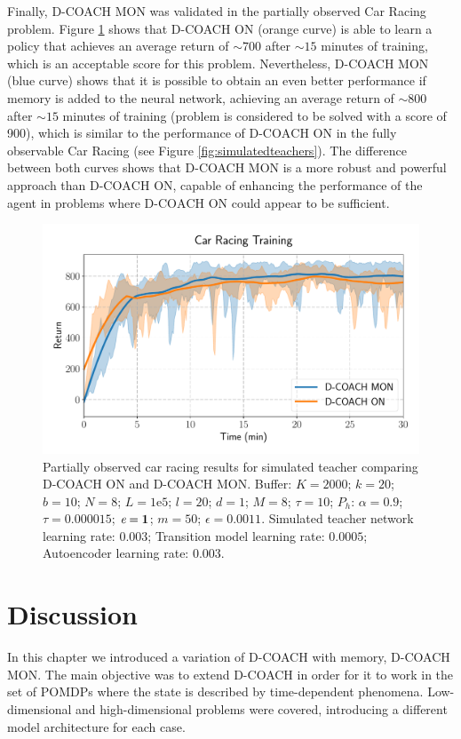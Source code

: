 Finally, D-COACH MON was validated in the partially observed Car Racing problem. Figure \ref{fig:po_cr} shows that D-COACH ON (orange curve) is able to learn a policy that achieves an average return of $\sim700$ after $\sim15$ minutes of training, which is an acceptable score for this problem. Nevertheless, D-COACH MON (blue curve) shows that it is possible to obtain an even better performance if memory is added to the neural network, achieving an average return of $\sim800$ after $\sim15$ minutes of training (problem is considered to be solved with a score of 900), which is similar to the performance of $\text{D-COACH}$ ON in the fully observable Car Racing (see Figure \ref{fig:simulatedteachers}). The difference between both curves shows that D-COACH MON is a more robust and powerful approach than $\text{D-COACH}$ ON, capable of enhancing the performance of the agent in problems where $\text{D-COACH}$ ON could appear to be sufficient.

\begin{figure}[H]
    \centering
    \includegraphics[width=0.7\linewidth]{imagenes/cap3/car_racing_lstm.pdf}
    \caption[Partially observed Car Racing results for simulated teacher comparing D-COACH ON and D-COACH MON.]{Partially observed car racing results for simulated teacher comparing D-COACH ON and D-COACH MON.  Buffer: $K = 2000$; $k=20$; $b=10$; $N = 8$; $L=1\mathrm{e}5$; $l=20$; $d=1$; $M=8$; $\tau=10$; $P_{h}$: $\alpha = 0.9$; $\tau = 0.000015$; $\emph{e}=\textbf{1}$; $m=50$; $\epsilon=0.0011$. Simulated teacher network learning rate: $0.003$; Transition model learning rate: $0.0005$; Autoencoder learning rate: $0.003$.}
    \label{fig:po_cr}
\end{figure}

\section{Discussion}
In this chapter we introduced a variation of D-COACH with memory, D-COACH MON. The main objective was to extend D-COACH in order for it to work in the set of POMDPs where the state is described by time-dependent phenomena. Low-dimensional and high-dimensional problems were covered, introducing a different model architecture for each case. 

